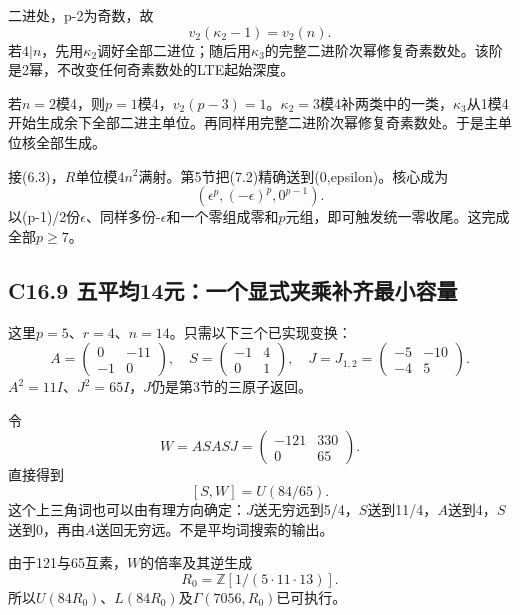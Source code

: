 \documentclass[11pt,a4paper]{article}
\theoremstyle{definition}
\numberwithin{equation}{section}
\begin{document}
{二进处，p-2为奇数，故} \[
v_2(\kappa_2-1)=v_2(n).
\] {若\ensuremath{4|n}，先用\ensuremath{\kappa _{2}}调好全部二进位；随后用\ensuremath{\kappa _{3}}的完整二进阶次幂修复奇素数处。该阶是2幂，不改变任何奇素数处的LTE起始深度。}

{若\ensuremath{n=2}模4，则\ensuremath{p=1}模4，\ensuremath{v_{2}(p-3)=1}。\ensuremath{\kappa _{2}=3}模4补两类中的一类，\ensuremath{\kappa _{3}}从1模4开始生成余下全部二进主单位。再同样用完整二进阶次幂修复奇素数处。于是主单位核全部生成。}

{接(6.3)，\ensuremath{R}单位模\ensuremath{4n^{2}}满射。第5节把(7.2)精确送到(0,epsilon)。核心成为} \[
(\epsilon^p,(-\epsilon)^p,0^{p-1}).
\] {以(p-1)/2份\ensuremath{\epsilon }、同样多份-\ensuremath{\epsilon }和一个零组成零和\ensuremath{p}元组，即可触发统一零收尾。这完成全部\ensuremath{p\ge 7}。}

\subsection*{\texorpdfstring{{C16.9} {五平均14元：一个显式夹乘补齐最小容量}}{C16.9 五平均14元：一个显式夹乘补齐最小容量}}\label{C16-h121}

{这里\ensuremath{p=5}、\ensuremath{r=4}、\ensuremath{n=14}。只需以下三个已实现变换：} \[
A=\begin{pmatrix}0&-11\\-1&0\end{pmatrix},\quad
S=\begin{pmatrix}-1&4\\0&1\end{pmatrix},\quad
J=J_{1,2}=\begin{pmatrix}-5&-10\\-4&5\end{pmatrix}.
\] {\ensuremath{A^{2}=11I}、\ensuremath{J^{2}=65I}，\ensuremath{J}仍是第3节的三原子返回。}

{令} \[
W=ASASJ=
\begin{pmatrix}-121&330\\0&65\end{pmatrix}.
\] {直接得到} \[
[S,W]=U(84/65).
\tag{C16.9.1}
\] {这个上三角词也可以由有理方向确定：\ensuremath{J}送无穷远到5/4，\ensuremath{S}送到11/4，\ensuremath{A}送到4，\ensuremath{S}送到0，再由\ensuremath{A}送回无穷远。不是平均词搜索的输出。}

{由于121与65互素，\ensuremath{W}的倍率及其逆生成} \[
R_0=\mathbb Z[1/(5\cdot11\cdot13)].
\] {所以\ensuremath{U(84R_{0})}、\ensuremath{L(84R_{0})}及\ensuremath{\Gamma (7056,R_{0})}已可执行。}
\end{document}
